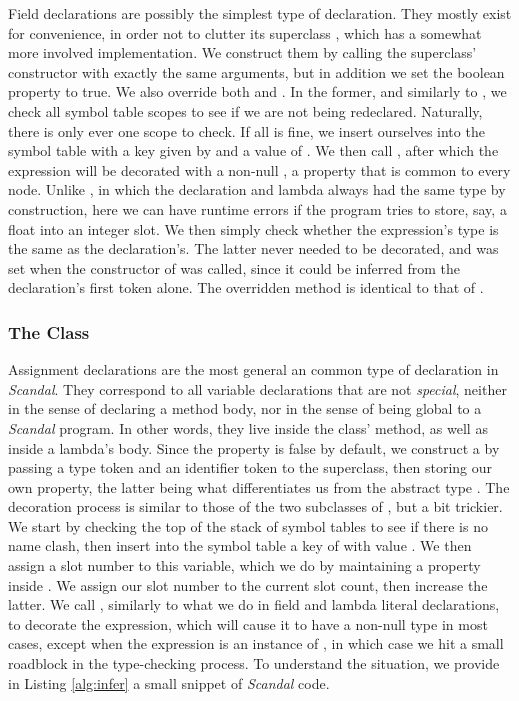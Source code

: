 Field declarations are possibly the simplest type of declaration. They mostly exist for convenience, in order not to clutter its superclass , which has a somewhat more involved implementation. We construct them by calling the superclass' constructor with exactly the same arguments, but in addition we set the  boolean property to true. We also override both  and . In the former, and similarly to , we check all symbol table scopes to see if we are not being redeclared. Naturally, there is only ever one scope to check. If all is fine, we insert ourselves into the symbol table with a key given by  and a value of . We then call , after which the expression will be decorated with a non-null , a property that is common to every node. Unlike , in which the declaration and lambda always had the same type by construction, here we can have runtime errors if the program tries to store, say, a float into an integer slot. We then simply check whether the expression's type is the same as the declaration's. The latter never needed to be decorated, and was set when the constructor of  was called, since it could be inferred from the declaration's first token alone. The overridden  method is identical to that of .

\subsubsection{The  Class}

Assignment declarations are the most general an common type of declaration in \emph{Scandal}. They correspond to all variable declarations that are not \emph{special}, neither in the sense of declaring a method body, nor in the sense of being global to a \emph{Scandal} program. In other words, they live inside the  class'  method, as well as inside a lambda's body. Since the  property is false by default, we construct a  by passing a type token and an identifier token to the superclass, then storing our own  property, the latter being what differentiates us from the abstract type . The decoration process is similar to those of the two subclasses of , but a bit trickier. We start by checking the top of the stack of symbol tables to see if there is no name clash, then insert into the symbol table a key of  with value . We then assign a slot number to this variable, which we do by maintaining a property  inside . We assign our slot number to the current slot count, then increase the latter. We call , similarly to what we do in field and lambda literal declarations, to decorate the expression, which will cause it to have a non-null type in most cases, except when the expression is an instance of , in which case we hit a small roadblock in the type-checking process. To understand the situation, we provide in Listing \ref{alg:infer} a small snippet of \emph{Scandal} code.

